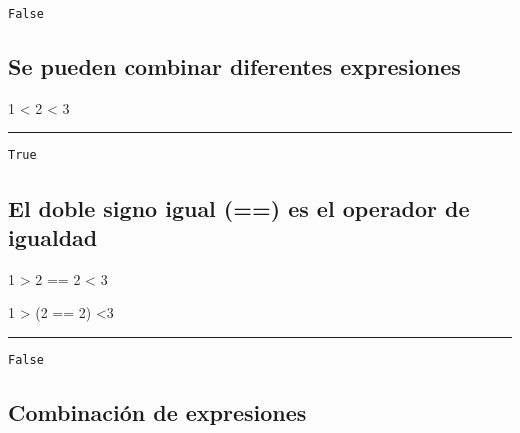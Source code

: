\documentclass[]{article}
\newenvironment{Shaded}{}{}
\newcommand{\DecValTok}[1]{\textcolor[rgb]{0.25,0.63,0.44}{#1}}
\newcommand{\OperatorTok}[1]{\textcolor[rgb]{0.40,0.40,0.40}{#1}}
\newcommand{\NormalTok}[1]{#1}
\begin{document}
\begin{verbatim}
False
\end{verbatim}

\subsection{Se pueden combinar diferentes
expresiones}\label{se-pueden-combinar-diferentes-expresiones}

\begin{Shaded}
\begin{Highlighting}[]
\DecValTok{1} \OperatorTok{<} \DecValTok{2} \OperatorTok{<} \DecValTok{3}
\end{Highlighting}
\end{Shaded}

\begin{center}\rule{0.5\linewidth}{\linethickness}\end{center}

\begin{verbatim}
True
\end{verbatim}

\subsection{El doble signo igual (==) es el operador de
igualdad}\label{el-doble-signo-igual-es-el-operador-de-igualdad}

\begin{Shaded}
\begin{Highlighting}[]
\DecValTok{1} \OperatorTok{>} \DecValTok{2} \OperatorTok{==} \DecValTok{2} \OperatorTok{<} \DecValTok{3}
\end{Highlighting}
\end{Shaded}

\begin{Shaded}
\begin{Highlighting}[]
\DecValTok{1} \OperatorTok{>}\NormalTok{ (}\DecValTok{2} \OperatorTok{==}  \DecValTok{2}\NormalTok{) }\OperatorTok{<}\DecValTok{3}
\end{Highlighting}
\end{Shaded}

\begin{center}\rule{0.5\linewidth}{\linethickness}\end{center}

\begin{verbatim}
False
\end{verbatim}

\subsection{Combinación de
expresiones}\label{combinaciuxf3n-de-expresiones}
\end{document}
